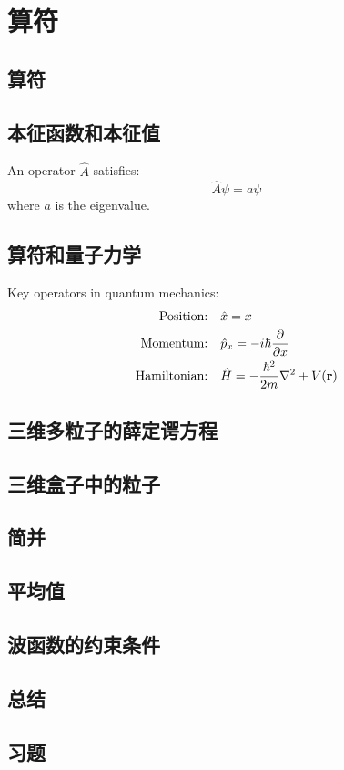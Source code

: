 \chapter{算符}
\section{算符}

\section{本征函数和本征值}
An operator $\hat{A}$ satisfies:
\begin{equation}
	\hat{A} \psi = a \psi
\end{equation}
where $a$ is the eigenvalue.

\section{算符和量子力学}
Key operators in quantum mechanics:
\begin{align}
	\text{Position:} & \quad \hat{x} = x \\
	\text{Momentum:} & \quad \hat{p}_x = -i\hbar \pdv{x} \\
	\text{Hamiltonian:} & \quad \hat{H} = -\frac{\hbar^2}{2m} \nabla^2 + V(\mathbf{r})
\end{align}

\section{三维多粒子的薛定谔方程}

\section{三维盒子中的粒子}

\section{简并}

\section{平均值}

\section{波函数的约束条件}

\section*{总结}

\section*{习题}